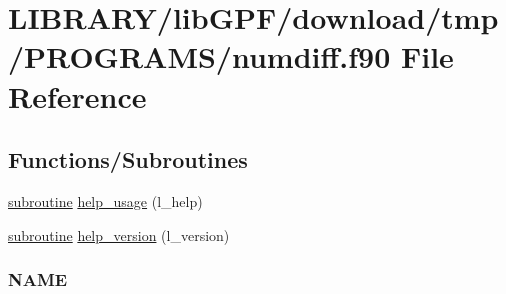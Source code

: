 \hypertarget{numdiff_8f90}{}\section{L\+I\+B\+R\+A\+R\+Y/lib\+G\+P\+F/download/tmp/\+P\+R\+O\+G\+R\+A\+M\+S/numdiff.f90 File Reference}
\label{numdiff_8f90}
\subsection*{Functions/\+Subroutines}
\begin{DoxyCompactItemize}
\item 
\hyperlink{M__stopwatch_83_8txt_acfbcff50169d691ff02d4a123ed70482}{subroutine} \hyperlink{numdiff_8f90_a3e09a3b52ee8fb04eeb93fe5761626a8}{help\+\_\+usage} (l\+\_\+help)
\item 
\hyperlink{M__stopwatch_83_8txt_acfbcff50169d691ff02d4a123ed70482}{subroutine} \hyperlink{numdiff_8f90_a39c21619b08a3c22f19e2306efd7f766}{help\+\_\+version} (l\+\_\+version)
\begin{DoxyCompactList}\small\item\em \subsubsection*{N\+A\+ME}


\end{DoxyCompactList}
\end{DoxyCompactItemize}
